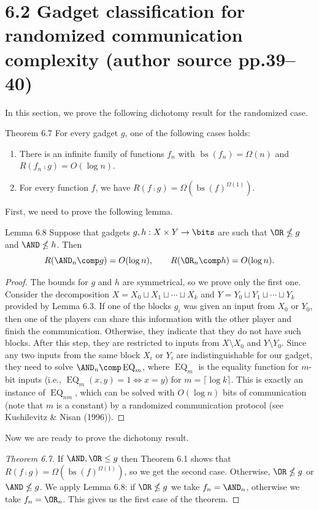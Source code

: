\section*{6.2 Gadget classification for randomized communication complexity (author source pp.39--40)}
In this section, we prove the following dichotomy result for the randomized case.
\begin{originalresult}{Theorem 6.7}
For every gadget $g$, one of the following cases holds:
\begin{enumerate}
\item[(i)] There is an infinite family of functions $f_n$ with $\operatorname{bs}(f_n)=\Omega(n)$ and $R(f_n\comp g)=O(\log n)$.
\item[(ii)] For every function $f$, we have $R(f\comp g)=\Omega(\operatorname{bs}(f)^{\Omega(1)})$.
\end{enumerate}
\end{originalresult}
First, we need to prove the following lemma.
\begin{originalresult}{Lemma 6.8}
Suppose that gadgets $g,h:X\times Y\to\bits$ are such that $\OR\nleq g$ and $\AND\nleq h$. Then
\[R(\AND_n\comp g)=O(\log n),\qquad R(\OR_n\comp h)=O(\log n).\]
\end{originalresult}
\begin{proof}
The bounds for $g$ and $h$ are symmetrical, so we prove only the first one. Consider the decomposition $X=X_0\sqcup X_1\sqcup\cdots\sqcup X_k$ and $Y=Y_0\sqcup Y_1\sqcup\cdots\sqcup Y_k$ provided by Lemma 6.3. If one of the blocks $g_i$ was given an input from $X_0$ or $Y_0$, then one of the players can share this information with the other player and finish the communication. Otherwise, they indicate that they do not have such blocks. After this step, they are restricted to inputs from $X\setminus X_0$ and $Y\setminus Y_0$. Since any two inputs from the same block $X_i$ or $Y_i$ are indistinguishable for our gadget, they need to solve $\AND_n\comp\operatorname{EQ}_m$, where $\operatorname{EQ}_m$ is the equality function for $m$-bit inputs (i.e., $\operatorname{EQ}_m(x,y)=1\iff x=y$) for $m=\lceil\log k\rceil$. This is exactly an instance of $\operatorname{EQ}_{nm}$, which can be solved with $O(\log n)$ bits of communication (note that $m$ is a constant) by a randomized communication protocol (see Kushilevitz \& Nisan (1996)).
\end{proof}
Now we are ready to prove the dichotomy result.
\begin{proof}[Theorem 6.7]
If $\AND,\OR\le g$ then Theorem 6.1 shows that $R(f\comp g)=\Omega(\operatorname{bs}(f)^{\Omega(1)})$, so we get the second case.
Otherwise, $\OR\nleq g$ or $\AND\nleq g$. We apply Lemma 6.8: if $\OR\nleq g$ we take $f_n=\AND_n$, otherwise we take $f_n=\OR_n$. This gives us the first case of the theorem.
\end{proof}
